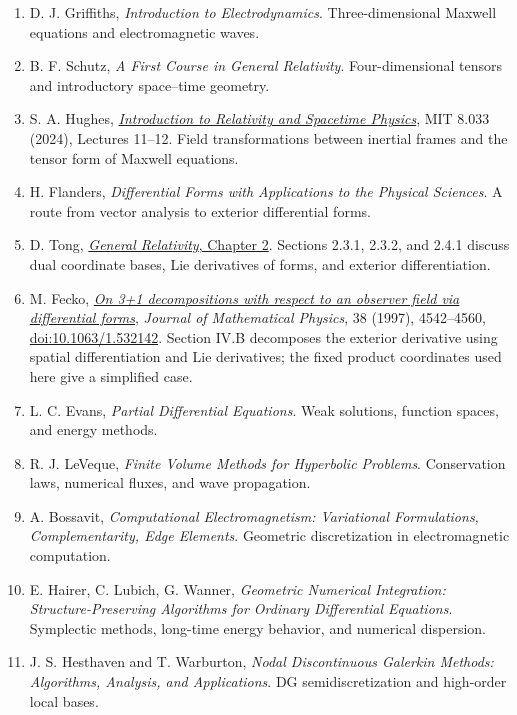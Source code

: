 \documentclass[11pt,openany]{book}
\numberwithin{equation}{chapter}
\theoremstyle{definition}
\theoremstyle{remark}
\begin{document}
\begin{enumerate}
\raggedright
\item D. J. Griffiths, \emph{Introduction to Electrodynamics}. Three-dimensional Maxwell equations and electromagnetic waves.
\item B. F. Schutz, \emph{A First Course in General Relativity}. Four-dimensional tensors and introductory space--time geometry.
\item S. A. Hughes, \href{https://ocw.mit.edu/courses/8-033-introduction-to-relativity-and-spacetime-physics-fall-2024/mit8_033_f24_lec_full.pdf}{\emph{Introduction to Relativity and Spacetime Physics}}, MIT 8.033 (2024), Lectures 11--12.
Field transformations between inertial frames and the tensor form of Maxwell equations.
\item H. Flanders, \emph{Differential Forms with Applications to the Physical Sciences}. A route from vector analysis to exterior differential forms.
\item D. Tong, \href{https://www.davidtong.org/teaching/general-relativity/grhtml/S2}{\emph{General Relativity}, Chapter 2}.
Sections 2.3.1, 2.3.2, and 2.4.1 discuss dual coordinate bases, Lie derivatives of forms, and exterior differentiation.
\item M. Fecko, \href{https://arxiv.org/abs/gr-qc/9701066}{\emph{On 3+1 decompositions with respect to an observer field via differential forms}},
\emph{Journal of Mathematical Physics}, 38 (1997), 4542--4560,
\href{https://doi.org/10.1063/1.532142}{doi:10.1063/1.532142}.
Section IV.B decomposes the exterior derivative using spatial differentiation and Lie derivatives;
the fixed product coordinates used here give a simplified case.
\item L. C. Evans, \emph{Partial Differential Equations}. Weak solutions, function spaces, and energy methods.
\item R. J. LeVeque, \emph{Finite Volume Methods for Hyperbolic Problems}. Conservation laws, numerical fluxes, and wave propagation.
\item A. Bossavit, \emph{Computational Electromagnetism: Variational Formulations, Complementarity, Edge Elements}. Geometric discretization in electromagnetic computation.
\item E. Hairer, C. Lubich, G. Wanner, \emph{Geometric Numerical Integration: Structure-Preserving Algorithms for Ordinary Differential Equations}. Symplectic methods, long-time energy behavior, and numerical dispersion.
\item J. S. Hesthaven and T. Warburton, \emph{Nodal Discontinuous Galerkin Methods: Algorithms, Analysis, and Applications}. DG semidiscretization and high-order local bases.

\end{enumerate}
\end{document}
